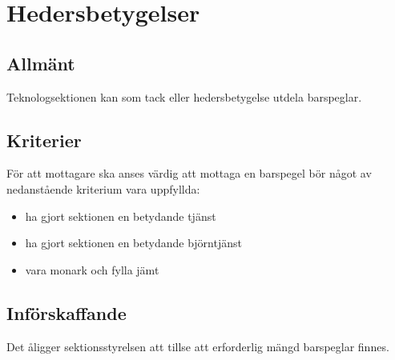 \documentclass[a4paper]{dtek}
\begin{document}
\section{Hedersbetygelser}
\subsection{Allmänt}
Teknologsektionen kan som tack eller hedersbetygelse utdela barspeglar.
\subsection{Kriterier}
För att mottagare ska anses värdig att mottaga en barspegel bör något av nedanstående kriterium vara uppfyllda:
\begin{itemize}
\item ha gjort sektionen en betydande tjänst
\item ha gjort sektionen en betydande björntjänst
\item vara monark och fylla jämt
\end{itemize}
\subsection{Införskaffande}
Det åligger sektionsstyrelsen att tillse att erforderlig mängd barspeglar finnes.
\end{document}
